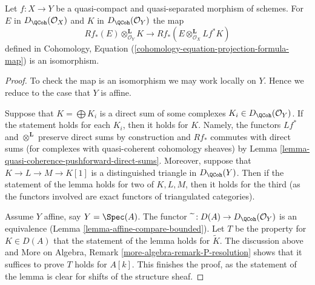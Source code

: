 \begin{lemma}
\label{lemma-cohomology-base-change}
Let $f : X \to Y$ be a quasi-compact and quasi-separated morphism
of schemes. For $E$ in $D_\QCoh(\mathcal{O}_X)$ and
$K$ in $D_\QCoh(\mathcal{O}_Y)$ the map
$$
Rf_*(E) \otimes_{\mathcal{O}_Y}^\mathbf{L} K
\longrightarrow
Rf_*(E \otimes_{\mathcal{O}_X}^\mathbf{L} Lf^*K)
$$
defined in
Cohomology, Equation (\ref{cohomology-equation-projection-formula-map})
is an isomorphism.
\end{lemma}

\begin{proof}
To check the map is an isomorphism we may work locally on $Y$.
Hence we reduce to the case that $Y$ is affine.

\medskip\noindent
Suppose that $K = \bigoplus K_i$ is a direct
sum of some complexes $K_i \in D_\QCoh(\mathcal{O}_Y)$.
If the statement holds for each $K_i$, then it holds for $K$.
Namely, the functors $Lf^*$ and $\otimes^\mathbf{L}$ preserve
direct sums by construction and $Rf_*$ commutes with direct sums
(for complexes with quasi-coherent cohomology sheaves) by
Lemma \ref{lemma-quasi-coherence-pushforward-direct-sums}.
Moreover, suppose that $K \to L \to M \to K[1]$ is a distinguished
triangle in $D_\QCoh(Y)$. Then if the statement of the
lemma holds for two of $K, L, M$, then it holds for the third
(as the functors involved are exact functors of triangulated categories).

\medskip\noindent
Assume $Y$ affine, say $Y = \Spec(A)$. The functor
$\widetilde{\ } : D(A) \to D_\QCoh(\mathcal{O}_Y)$ is an equivalence
(Lemma \ref{lemma-affine-compare-bounded}).
Let $T$ be the property for $K \in D(A)$ that
the statement of the lemma holds for $\widetilde{K}$.
The discussion above and
More on Algebra, Remark \ref{more-algebra-remark-P-resolution}
shows that it suffices to prove $T$ holds for $A[k]$.
This finishes the proof, as the statement of the lemma
is clear for shifts of the structure sheaf.
\end{proof}
